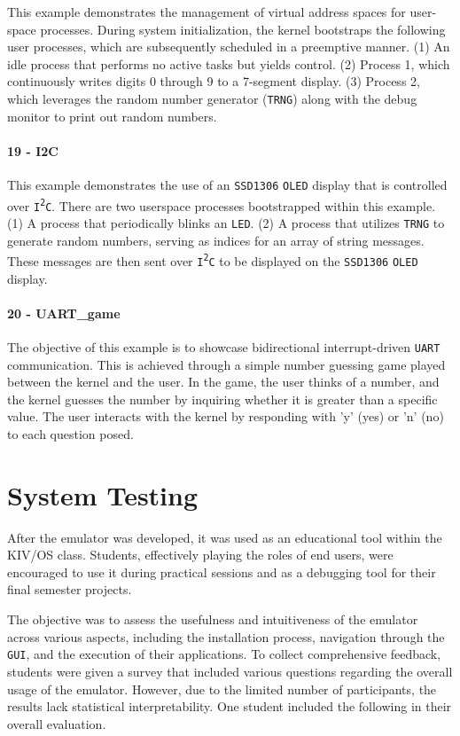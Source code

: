 \documentclass[english, ing, kiv, he, iso690numb, pdf]{fasthesis}
\begin{document}
	This example demonstrates the management of virtual address spaces for user-space processes. During system initialization, the kernel bootstraps the following user processes, which are subsequently scheduled in a preemptive manner. (1) An idle process that performs no active tasks but yields control. (2) Process 1, which continuously writes digits 0 through 9 to a 7-segment display. (3) Process 2, which leverages the random number generator (\texttt{TRNG}) along with the debug monitor to print out random numbers.
	
	\paragraph{19 - I2C}
	
	This example demonstrates the use of an \texttt{SSD1306} \texttt{OLED} display that is controlled over \texttt{I\textsuperscript{2}C}. There are two userspace processes bootstrapped within this example. (1)  A  process that periodically blinks an \texttt{LED}. (2) A process that utilizes \texttt{TRNG} to generate random numbers, serving as indices for an array of string messages. These messages are then sent over \texttt{I\textsuperscript{2}C} to be displayed on the \texttt{SSD1306} \texttt{OLED} display.
	
	\paragraph{20 - UART\_game}
	
	The objective of this example is to showcase bidirectional interrupt-driven \texttt{UART} communication. This is achieved through a simple number guessing game played between the kernel and the user. In the game, the user thinks of a number, and the kernel guesses the number by inquiring whether it is greater than a specific value. The user interacts with the kernel by responding with 'y' (yes) or 'n' (no) to each question posed.
	
	\section{System Testing}
	
	After the emulator was developed, it was used as an educational tool within the KIV/OS class. Students, effectively playing the roles of end users, were encouraged to use it during practical sessions and as a debugging tool for their final semester projects.
	
	The objective was to assess the usefulness and intuitiveness of the emulator across various aspects, including the installation process, navigation through the \texttt{GUI}, and the execution of their applications. To collect comprehensive feedback, students were given a survey that included various questions regarding the overall usage of the emulator. However, due to the limited number of participants, the results lack statistical interpretability. One student included the following in their overall evaluation.
	
\end{document}
